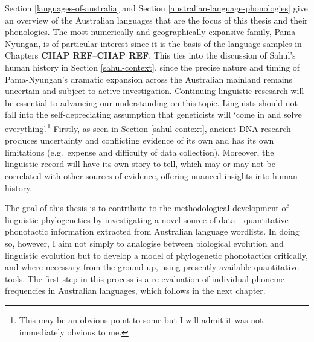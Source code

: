 Section \ref{languages-of-australia} and Section \ref{australian-language-phonologies} give an overview of the Australian languages that are the focus of this thesis and their phonologies. The most numerically and geographically expansive family, Pama-Nyungan, is of particular interest since it is the basis of the language samples in Chapters \textbf{CHAP REF}--\textbf{CHAP REF}. This ties into the discussion of Sahul's human history in Section \ref{sahul-context}, since the precise nature and timing of Pama-Nyungan's dramatic expansion across the Australian mainland remains uncertain and subject to active investigation. Continuing linguistic resesarch will be essential to advancing our understanding on this topic. Linguists should not fall into the self-depreciating assumption that geneticists will `come in and solve everything'.\footnote{This may be an obvious point to some but I will admit it was not immediately obvious to me.} Firstly, as seen in Section \ref{sahul-context}, ancient DNA research produces uncertainty and conflicting evidence of its own and has its own limitations (e.g.~expense and difficulty of data collection). Moreover, the linguistic record will have its own story to tell, which may or may not be correlated with other sources of evidence, offering nuanced insights into human history.

The goal of this thesis is to contribute to the methodological development of linguistic phylogenetics by investigating a novel source of data---quantitative phonotactic information extracted from Australian language wordlists. In doing so, however, I aim not simply to analogise between biological evolution and linguistic evolution but to develop a model of phylogenetic phonotactics critically, and where necessary from the ground up, using presently available quantitative tools. The first step in this process is a re-evaluation of individual phoneme frequencies in Australian languages, which follows in the next chapter.

